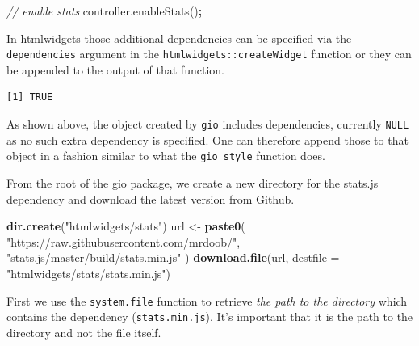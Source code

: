 \documentclass[
]{krantz}
\makeatletter
\newenvironment{Shaded}{\begin{snugshade}}{\end{snugshade}}
\newcommand{\AttributeTok}[1]{\textcolor[rgb]{0.61,0.61,0.61}{#1}}
\newcommand{\CommentTok}[1]{\textcolor[rgb]{0.37,0.37,0.37}{\textit{#1}}}
\newcommand{\DataTypeTok}[1]{\textcolor[rgb]{0.27,0.27,0.27}{#1}}
\newcommand{\KeywordTok}[1]{\textcolor[rgb]{0.27,0.27,0.27}{\textbf{#1}}}
\newcommand{\NormalTok}[1]{#1}
\newcommand{\OperatorTok}[1]{\textcolor[rgb]{0.43,0.43,0.43}{\textbf{#1}}}
\newcommand{\StringTok}[1]{\textcolor[rgb]{0.5,0.5,0.5}{#1}}
\newcommand{\VariableTok}[1]{\textcolor[rgb]{0,0,0}{#1}}
\newenvironment{kframe}{%
\medskip{}
\setlength{\fboxsep}{.8em}
 \def\at@end@of@kframe{}%
 \ifinner\ifhmode%
  \def\at@end@of@kframe{\end{minipage}}%
  \begin{minipage}{\columnwidth}%
 \fi\fi%
 \def\FrameCommand##1{\hskip\@totalleftmargin \hskip-\fboxsep
 \colorbox{shadecolor}{##1}\hskip-\fboxsep
     \hskip-\linewidth \hskip-\@totalleftmargin \hskip\columnwidth}%
 \MakeFramed {\advance\hsize-\width
   \@totalleftmargin\z@ \linewidth\hsize
   \@setminipage}}%
 {\par\unskip\endMakeFramed%
 \at@end@of@kframe}
\renewenvironment{Shaded}{\begin{kframe}}{\end{kframe}}
\makeatother
\begin{document}
\begin{Shaded}
\begin{Highlighting}[]
\CommentTok{// enable stats}
\VariableTok{controller}\NormalTok{.}\AttributeTok{enableStats}\NormalTok{()}\OperatorTok{;}
\end{Highlighting}
\end{Shaded}

In htmlwidgets those additional dependencies can be specified via the \texttt{dependencies} argument in the \texttt{htmlwidgets::createWidget} function or they can be appended to the output of that function.

\begin{Shaded}
\end{Shaded}

\begin{verbatim}
[1] TRUE
\end{verbatim}

As shown above, the object created by \texttt{gio} includes dependencies, currently \texttt{NULL} as no such extra dependency is specified. One can therefore append those to that object in a fashion similar to what the \texttt{gio\_style} function does.

From the root of the gio package, we create a new directory for the stats.js dependency and download the latest version from Github.

\begin{Shaded}
\begin{Highlighting}[]
\KeywordTok{dir.create}\NormalTok{(}\StringTok{"htmlwidgets/stats"}\NormalTok{)}
\NormalTok{url <{-}}\StringTok{ }\KeywordTok{paste0}\NormalTok{(}
  \StringTok{"https://raw.githubusercontent.com/mrdoob/"}\NormalTok{,}
  \StringTok{"stats.js/master/build/stats.min.js"}
\NormalTok{)}
\KeywordTok{download.file}\NormalTok{(url, }\DataTypeTok{destfile =} \StringTok{"htmlwidgets/stats/stats.min.js"}\NormalTok{)}
\end{Highlighting}
\end{Shaded}

First we use the \texttt{system.file} function to retrieve \emph{the path to the directory} which contains the dependency (\texttt{stats.min.js}). It's important that it is the path to the directory and not the file itself.
\end{document}
